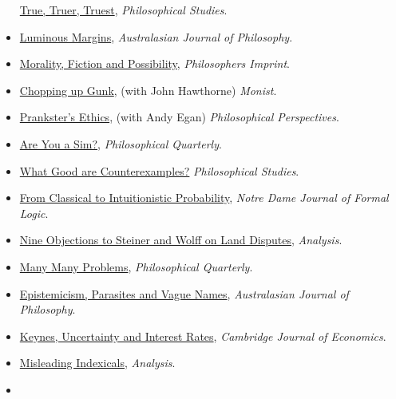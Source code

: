 \documentclass[
  10pt,
  letterpaper,
  DIV=11,
  numbers=noendperiod,
  twoside]{scrartcl}
\begin{document}
\begin{itemize}
  \href{https://brian.weatherson.org/quarto/posts/ttt/true-truer-truest.html}{True,
  Truer, Truest}, \emph{Philosophical Studies}.
\item
  \href{https://brian.weatherson.org/quarto/posts/lummarg/luminous-margins.html}{Luminous
  Margins}, \emph{Australasian Journal of Philosophy}.
\item
  \href{https://brian.weatherson.org/quarto/posts/mfp/morality-fiction-and-possibility.html}{Morality,
  Fiction and Possibility}, \emph{Philosophers Imprint}.
\item
  \href{https://brian.weatherson.org/quarto/posts/gunk/chopping-up-gunk.html}{Chopping
  up Gunk}, (with John Hawthorne) \emph{Monist}.
\item
  \href{https://brian.weatherson.org/quarto/posts/prank/pranksters-ethics.html}{Prankster's
  Ethics}, (with Andy Egan) \emph{Philosophical Perspectives}.
\item
  \href{https://brian.weatherson.org/quarto/posts/sims/are-you-a-sim.html}{Are
  You a Sim?}, \emph{Philosophical Quarterly}.
\item
  \href{https://brian.weatherson.org/quarto/posts/wgac/what-good-are-counterexamples.html}{What
  Good are Counterexamples?} \emph{Philosophical Studies}.
\item
  \href{https://brian.weatherson.org/quarto/posts/conprob/from-classical-to-intuitionistic-probability.html}{From
  Classical to Intuitionistic Probability}, \emph{Notre Dame Journal of
  Formal Logic}.
\item
  \href{https://brian.weatherson.org/quarto/posts/nine-obj/nine-objections-to-steiner-and-wolff-on-land-disputes.html}{Nine
  Objections to Steiner and Wolff on Land Disputes}, \emph{Analysis}.
\item
  \href{https://brian.weatherson.org/quarto/posts/mmp/many-many-problems.html}{Many
  Many Problems}, \emph{Philosophical Quarterly}.
\item
  \href{https://brian.weatherson.org/quarto/posts/epvn/epistemicism-parasites-and-vague-names.html}{Epistemicism,
  Parasites and Vague Names}, \emph{Australasian Journal of Philosophy}.
\item
  \href{https://brian.weatherson.org/quarto/posts/kuir/keynes-uncertainty-and-interest-rates.html}{Keynes,
  Uncertainty and Interest Rates}, \emph{Cambridge Journal of
  Economics}.
\item
  \href{https://brian.weatherson.org/quarto/posts/misindex/misleading-indexicals.html}{Misleading
  Indexicals}, \emph{Analysis}.
\item

\end{itemize}
\end{document}
